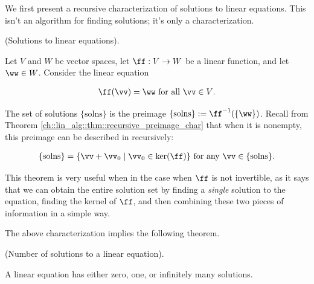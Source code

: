 We first present a recursive characterization of solutions to linear equations. This isn't an algorithm for finding solutions; it's only a characterization.

\begin{theorem}
\label{ch::lin_alg::thm::solutions_to_linear_equations}
    (Solutions to linear equations).

    Let $V$ and $W$ be vector spaces, let $\ff:V \rightarrow W$ be a linear function, and let $\ww \in W$. Consider the linear equation

    \begin{align*}
        \ff(\vv) = \ww \text{ for all $\vv \in V$}.
    \end{align*}
    
    The set of solutions $\{\text{solns}\}$ is the preimage $\{\text{solns}\} := \ff^{-1}(\{\ww\})$. Recall from Theorem \ref{ch::lin_alg::thm::recursive_preimage_char} that when it is nonempty, this preimage can be described in recursively:
    
    \begin{align*}
        \{\text{solns}\} = \{ \vv + \vv_0 \mid \vv_0 \in \ker(\ff) \} \text{ for any $\vv \in \{\text{solns}\}$}.
    \end{align*}

    This theorem is very useful when in the case when $\ff$ is not invertible, as it says that we can obtain the entire solution set by finding a \textit{single} solution to the equation, finding the kernel of $\ff$, and then combining these two pieces of information in a simple way.
\end{theorem}

The above characterization implies the following theorem.

\begin{theorem}
    (Number of solutions to a linear equation).

    A linear equation has either zero, one, or infinitely many solutions.
\end{theorem}

